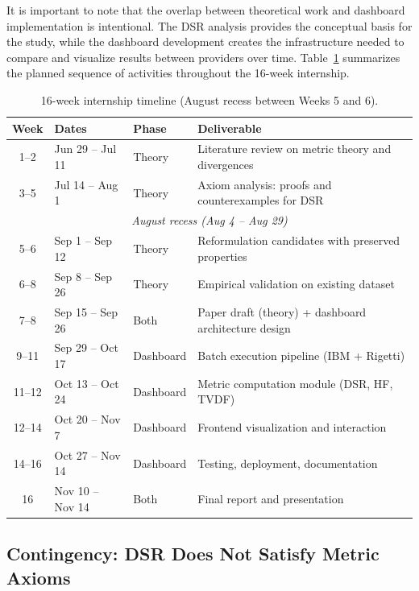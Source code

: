 \documentclass[11pt]{article}
\begin{document}
It is important to note that the overlap between theoretical work and dashboard implementation is intentional. The DSR analysis provides the conceptual basis for the study, while the dashboard development creates the infrastructure needed to compare and visualize results between providers over time. Table~\ref{tab:internship-timeline} summarizes the planned sequence of activities throughout the 16-week internship.

\begin{table}[!ht]
\centering
\caption{16-week internship timeline (August recess between Weeks 5 and 6).}
\label{tab:internship-timeline}
\begin{tabular}{@{}cllp{6.5cm}@{}}
\toprule
\textbf{Week} & \textbf{Dates} & \textbf{Phase} & \textbf{Deliverable} \\
\midrule
1--2   & Jun 29 -- Jul 11  & Theory    & Literature review on metric theory and divergences \\
3--5   & Jul 14 -- Aug 1   & Theory    & Axiom analysis: proofs and counterexamples for DSR \\
\midrule
\multicolumn{4}{c}{\textit{August recess (Aug 4 -- Aug 29)}} \\
\midrule
5--6   & Sep 1 -- Sep 12   & Theory    & Reformulation candidates with preserved properties \\
6--8   & Sep 8 -- Sep 26   & Theory    & Empirical validation on existing dataset \\
7--8   & Sep 15 -- Sep 26  & Both      & Paper draft (theory) + dashboard architecture design \\
9--11  & Sep 29 -- Oct 17  & Dashboard & Batch execution pipeline (IBM + Rigetti) \\
11--12 & Oct 13 -- Oct 24  & Dashboard & Metric computation module (DSR, HF, TVDF) \\
12--14 & Oct 20 -- Nov 7   & Dashboard & Frontend visualization and interaction \\
14--16 & Oct 27 -- Nov 14  & Dashboard & Testing, deployment, documentation \\
16     & Nov 10 -- Nov 14  & Both      & Final report and presentation \\
\bottomrule
\end{tabular}
\end{table}

\subsection{Contingency: DSR Does Not Satisfy Metric Axioms}
\end{document}
